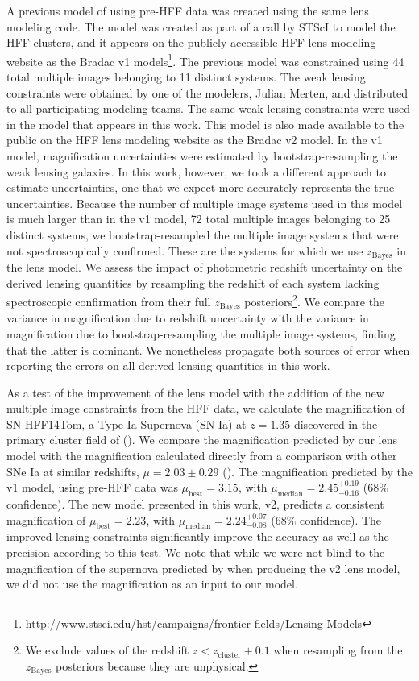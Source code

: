 A previous model of \cler using pre-HFF data was created using the same lens modeling code. The model was created
as part of a call by STScI to model the HFF clusters, and it appears on the publicly accessible HFF lens modeling
website as the Bradac v1
models\footnote{\url{http://www.stsci.edu/hst/campaigns/frontier-fields/Lensing-Models}}. The previous model was
constrained using 44 total multiple images belonging to 11 distinct systems. The weak lensing constraints were
obtained by one of the modelers, Julian Merten, and distributed to all participating modeling teams. The same
weak lensing constraints were used in the model that appears in this work. This model is also made available to
the public on the HFF lens modeling website as the Bradac v2 model.  In the v1 model, magnification uncertainties
were estimated by bootstrap-resampling the weak lensing galaxies. In this work, however, we took a different
approach to estimate uncertainties, one that we expect more accurately represents the true uncertainties.
Because the number of multiple image systems used in this model is much larger than in the v1 model, 72 total
multiple images belonging to 25 distinct systems, we bootstrap-resampled the multiple image systems that were not
spectroscopically confirmed.  These are the systems for which we use $z_{\textrm{Bayes}}$ in the lens model.
We assess the impact of photometric redshift uncertainty on the derived lensing quantities by resampling
the redshift of each system lacking spectroscopic confirmation from their full $z_{\textrm{Bayes}}$
posteriors\footnote{We exclude values of the redshift $z<z_{\textrm{cluster}}+0.1$ when resampling from the
$z_{\textrm{Bayes}}$ posteriors because they are unphysical.}. We compare the variance in magnification due to
redshift uncertainty with the variance in magnification due to bootstrap-resampling the multiple image systems,
finding that the latter is dominant. We nonetheless propagate both sources of error when reporting the errors on
all derived lensing quantities in this work.

As a test of the improvement of the lens model with the addition of the new multiple image constraints from the
HFF data, we calculate the magnification of SN HFF14Tom, a Type Ia Supernova (SN Ia) at $z=1.35$ discovered in
the primary cluster field of \cler (\citealp{Rod++15}). We compare the magnification predicted by our lens model
with the magnification calculated directly from a comparison with other SNe Ia at similar redshifts,
$\mu=2.03\pm0.29$ (\citealp{Rod++15}). The magnification predicted by the v1 model, using pre-HFF data was
$\mu_{\mathrm{best}} = 3.15$, with $\mu_{\mathrm{median}} = 2.45^{+0.19}_{-0.16}$ ($68\%$ confidence).
The new model presented in this work, v2, predicts a consistent magnification of $\mu_{\mathrm{best}} =
2.23$, with $\mu_{\mathrm{median}} = 2.24^{+0.07}_{-0.08}$ ($68\%$ confidence). The improved lensing constraints
significantly improve the accuracy as well as the precision according to this test. We note that while we were
not blind to the magnification of the supernova predicted by \citet{Rod++15} when producing the v2 lens model, we
did not use the magnification as an input to our model. 

